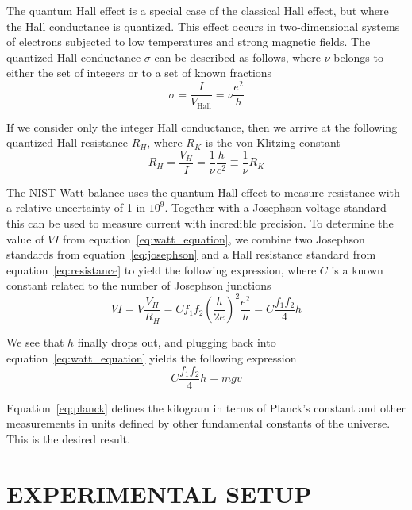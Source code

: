 \documentclass[aps,prstab,reprint,12pt]{revtex4-1}
\begin{document}
The quantum Hall effect is a special case of the classical Hall effect, but where the Hall conductance is quantized. This effect occurs in two-dimensional systems of electrons subjected to low temperatures and strong magnetic fields. The quantized Hall conductance $\sigma$ can be described as follows, where $\nu$ belongs to either the set of integers or to a set of known fractions
\begin{equation}
    \sigma = \frac{I}{V_\mathrm{Hall}} = \nu \frac{e^2}{h}
\end{equation}

If we consider only the integer Hall conductance, then we arrive at the following quantized Hall resistance $R_H$, where $R_K$ is the von Klitzing constant
\begin{equation}\label{eq:resistance}
    R_H=\frac{V_H}{I}=\frac{1}{\nu}\frac{h}{e^2} \equiv \frac{1}{\nu} R_K
\end{equation}

The NIST Watt balance uses the quantum Hall effect to measure resistance with a relative uncertainty of 1 in $10^9$. Together with a Josephson voltage standard this can be used to measure current with incredible precision. To determine the value of $VI$ from equation~\ref{eq:watt_equation}, we combine two Josephson standards from equation~\ref{eq:josephson} and a Hall resistance standard from equation~\ref{eq:resistance} to yield the following expression, where $C$ is a known constant related to the number of Josephson junctions
\begin{equation}
    VI=V \frac{V_H}{R_H} = C f_1 f_2 {\left(\frac{h}{2e}\right)}^2 \frac{e^2}{h}=C \frac{f_1f_2}{4} h
\end{equation}

We see that $h$ finally drops out, and plugging back into equation~\ref{eq:watt_equation} yields the following expression
\begin{equation}\label{eq:planck}
    C \frac{f_1f_2}{4} h = mgv
\end{equation}

Equation~\ref{eq:planck} defines the kilogram in terms of Planck's constant and other measurements in units defined by other fundamental constants of the universe. This is the desired result.




\section{EXPERIMENTAL SETUP}\label{s:device} %
\end{document}
